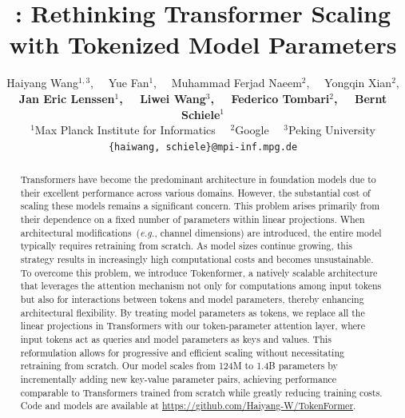 \documentclass{article} %
\title{\ourmethod: Rethinking Transformer Scaling with Tokenized Model Parameters}
\author{%
  Haiyang Wang$^{1,3}$, ~~Yue Fan$^{1}$, ~~Muhammad Ferjad Naeem$^{2}$, ~~Yongqin Xian$^{2}$, \\
  \textbf{Jan Eric Lenssen$^{1}$, ~~Liwei Wang$^{3}$, ~~Federico Tombari$^{2}$, ~~Bernt Schiele$^{1}$} \\
  {$^1$}Max Planck Institute for Informatics ~~{$^2$}Google ~~{$^3$}Peking University \\
  {\tt\small\{haiwang, schiele\}@mpi-inf.mpg.de}\\
}
\newcommand{\ourmethod}{Tokenformer\xspace}
\begin{document}
\maketitle
\begin{abstract}
Transformers have become the predominant architecture in foundation models due to their excellent performance across various domains. However, the substantial cost of scaling these models remains a significant concern. This problem arises primarily from their dependence on a fixed number of parameters within linear projections. When architectural modifications~(\textit{e.g.}, channel dimensions) are introduced, the entire model typically requires retraining from scratch. As model sizes continue growing, this strategy results in increasingly high computational costs and becomes unsustainable. To overcome this problem, we introduce \ourmethod, a natively scalable architecture that leverages the attention mechanism not only for computations among input tokens but also for interactions between tokens and model parameters, thereby enhancing architectural flexibility. By treating model parameters as tokens, we replace all the linear projections in Transformers with our token-parameter attention layer, where input tokens act as queries and model parameters as keys and values. This reformulation allows for progressive and efficient scaling without necessitating retraining from scratch. Our model scales from 124M to 1.4B parameters by incrementally adding new key-value parameter pairs, achieving performance comparable to Transformers trained from scratch while greatly reducing training costs. Code and models are available at {\color{red}\url{https://github.com/Haiyang-W/TokenFormer}}.
\end{abstract}
\end{document}
